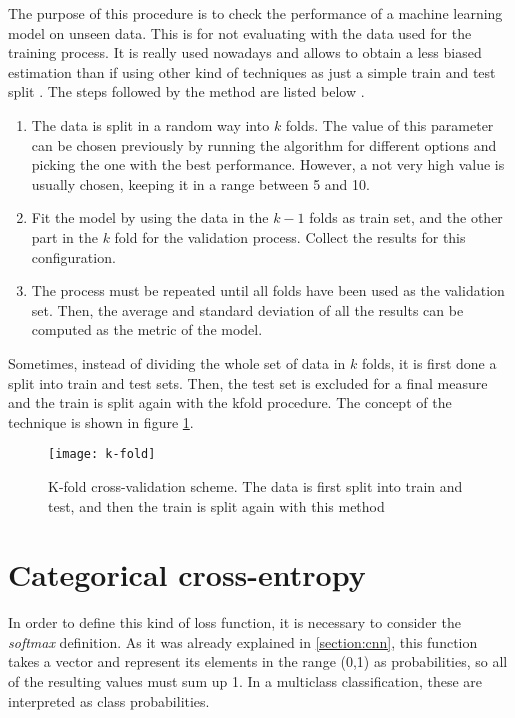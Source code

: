 	The purpose of this procedure is to check the performance of a machine learning model on unseen data. This is for not evaluating with the data used for the training process. It is really used nowadays and allows to obtain a less biased estimation than if using other kind of techniques as just a simple train and test split \cite{Browniee2018}. The steps followed by the method are listed below \cite{M2018}.
	
	\begin{enumerate}
		\item The data is split in a random way into $k$ folds. The value of this parameter can be chosen previously by running the algorithm for different options and picking the one with the best performance. However, a not very high value is usually chosen, keeping it in a range between 5 and 10.
		\item Fit the model by using the data in the $k - 1$ folds as train set, and the other part in the $k$ fold for the validation process. Collect the results for this configuration.
		\item The process must be repeated until all folds have been used as the validation set. Then, the average and standard deviation of all the results can be computed as the metric of the model. 
	\end{enumerate}

	Sometimes, instead of dividing the whole set of data in $k$ folds, it is first done a split into train and test sets. Then, the test set is excluded for a final measure and the train is split again with the \acrlong{kfold} procedure. The concept of the technique is shown in figure \ref{fig:mesh16}.
	
	\begin{figure}[ht]
		\centering
		\captionsetup{justification=centering}
		\texttt{[image: k-fold]}
		\caption{K-fold cross-validation scheme. The data is first split into train and test, and then the train is split again with this method \cite{Scikit-learna}}
		\label{fig:mesh16}
	\end{figure}

\section{Categorical cross-entropy}
\label{appendix:categorical-cross-entropy}

	In order to define this kind of loss function, it is necessary to consider the \textit{softmax} definition. As it was already explained in \ref{section:cnn}, this function takes a vector and represent its elements in the range (0,1) as probabilities, so all of the resulting values must sum up 1. In a multiclass classification, these are interpreted as class probabilities.
	
